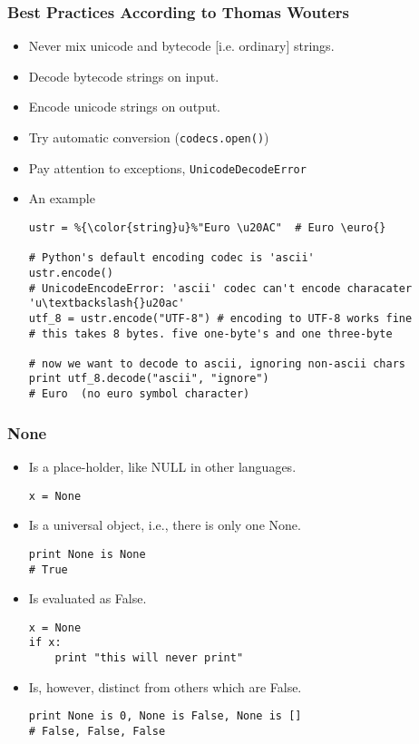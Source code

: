 \documentclass{beamer}
\begin{document}
\begin{frame}[fragile]
\frametitle{Best Practices According to 
            Thomas Wouters\cite{Wouters2012}}
\begin{itemize}
\item Never mix unicode and bytecode [i.e. ordinary] strings.
\item Decode bytecode strings on input.
\item Encode unicode strings on output.
\item Try automatic conversion (\lstinline{codecs.open()})
\item Pay attention to exceptions, \lstinline{UnicodeDecodeError}
\item An example
\begin{lstlisting}[escapechar=\%]
ustr = %{\color{string}u}%"Euro \u20AC"  # Euro \euro{}

# Python's default encoding codec is 'ascii'
ustr.encode()
# UnicodeEncodeError: 'ascii' codec can't encode characater  'u\textbackslash{}u20ac' 
utf_8 = ustr.encode("UTF-8") # encoding to UTF-8 works fine
# this takes 8 bytes. five one-byte's and one three-byte

# now we want to decode to ascii, ignoring non-ascii chars
print utf_8.decode("ascii", "ignore")
# Euro  (no euro symbol character)
\end{lstlisting}
\end{itemize}
\end{frame}

\begin{frame}[fragile]
\frametitle{None}
\begin{itemize}
\item Is a place-holder, like NULL in other languages.
\begin{lstlisting}
x = None
\end{lstlisting}
\item Is a universal object, i.e., there is only one None.
\begin{lstlisting}
print None is None
# True
\end{lstlisting}
\item Is evaluated as False.
\begin{lstlisting}
x = None
if x:
    print "this will never print"
\end{lstlisting}
\item Is, however, distinct from others which are False.
\begin{lstlisting}
print None is 0, None is False, None is []
# False, False, False
\end{lstlisting}
\end{itemize}
\end{frame}
\end{document}
